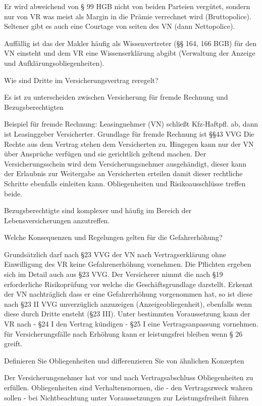 Er wird abweichend von § 99 HGB nicht von beiden Parteien vergütet, sondern nur von VR was meist als Margin
in die Prämie verrechnet wird (Bruttopolice). Seltener gibt es auch eine Courtage von seiten des VN (dann Nettopolice).

Auffällig ist das der Makler häufig als Wissenvertreter (§§ 164, 166 BGB) für den VN einsteht und dem VR eine Wissenserklärung abgibt
(Verwaltung der Anzeige und Aufklärungsobliegenheiten).


Wie sind Dritte im Versicherungsvertrag reregelt?

Es ist zu unterscheiden zwischen Versicherung für fremde Rechnung und Bezugsberechtigten

Beispiel für fremde Rechnung: Leasingnehmer (VN) schließt Kfz-Haftpfl. ab, dann ist Leasinggeber Versicherter.
Grundlage für fremde Rechnung ist §§43 VVG
Die Rechte aus dem Vertrag stehen dem Versicherten zu. Hingegen kann nur der VN über Ansprüche verfügen und sie gerichtlich geltend machen.
Der Versicherungsschein wird dem Versicherungsnehmer ausgehändigt, dieser kann der Erlaubnis zur Weitergabe an Versicherten erteilen
damit dieser rechtliche Schritte ebenfalls einleiten kann. Obliegenheiten und Risikoausschlüsse treffen beide.

Bezugsberechtigte sind komplexer und häufig im Bereich der Lebensversicherungen anzutreffen.


Welche Konsequenzen und Regelungen gelten für die Gefahrerhöhung?

Grundsätzlich darf nach §23 VVG der VN nach Vertragserklärung ohne Einwilligung des VR keine Gefahrenerhöhung 
vornehmen. Die Pflichten ergeben sich im Detail auch aus §23 VVG.
Der Versicherer nimmt die nach §19 erforderliche Risikoprüfung vor welche die Geschäftsgrundlage darstellt. 
Erkennt der VN nachträglich dass er eine Gefahrerhöhung vorgenommen hat, so ist diese nach §23 II VVG unverzüglich anzuzeigen
(Anzeigeobliegenheit), ebenfalls wenn diese durch Dritte ensteht (§23 III).
Unter bestimmten Voraussetzung kann der VR nach 
- §24 I den Vertrag kündigen
- §25 I eine Vertragsanpassung vornehmen. 
für Versicherungsfälle nach Erhöhung kann er leistungsfrei bleiben wenn § 26 greift.



Definieren Sie Obliegenheiten und differenzieren Sie von ähnlichen Konzepten 

Der Versicherungsnehmer hat vor und nach Vertragsabschluss Obliegenheiten zu erfüllen. 
Obliegenheiten sind Verhaltensnormen, die 
- den Vertragszweck wahren sollen 
- bei Nichtbeachtung unter Voraussetzungen zur Leistungsfreiheit führen

